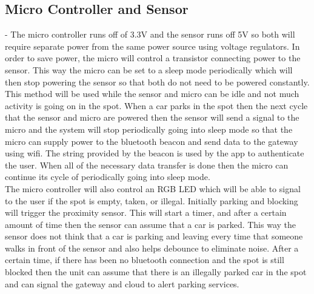 \documentclass{article}
\begin{document}
\subsection{\textbf{Micro Controller and Sensor}} - The micro controller runs off of 3.3V and the sensor runs off 5V so both will require separate power from the same power source using voltage regulators. In order to save power, the micro will control a transistor connecting power to the sensor. This way the micro can be set to a sleep mode periodically which will then stop powering the sensor so that both do not need to be powered constantly. This method will be used while the sensor and micro can be idle and not much activity is going on in the spot. When a car parks in the spot then the next cycle that the sensor and micro are powered then the sensor will send a signal to the micro and the system will stop periodically going into sleep mode so that the micro can supply power to the bluetooth beacon and send data to the gateway using wifi. The string provided by the beacon is used by the app to authenticate the user. When all of the necessary data transfer is done then the micro can continue its cycle of periodically going into sleep mode.\\
The micro controller will also control an RGB LED which will be able to signal to the user if the spot is empty, taken, or illegal. Initially parking and blocking will trigger the proximity sensor. This will start a timer, and after a certain amount of time then the sensor can assume that a car is parked. This way the sensor does not think that a car is parking and leaving every time that someone walks in front of the sensor and also helps debounce to eliminate noise. After a certain time, if there has been no bluetooth connection and the spot is still blocked then the unit can assume that there is an illegally parked car in the spot and can signal the gateway and cloud to alert parking services. 
\end{document}
